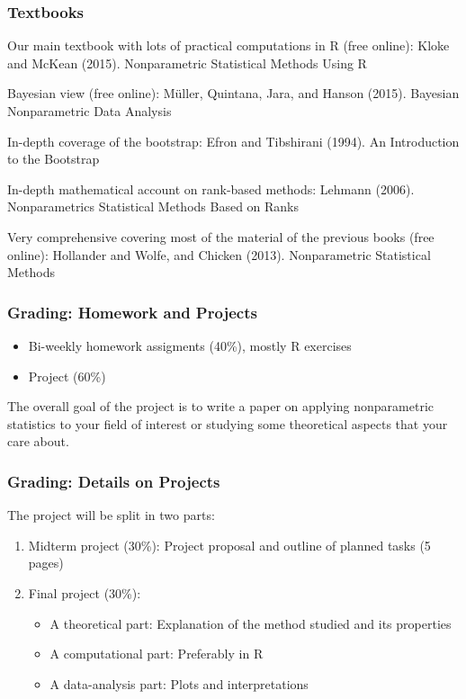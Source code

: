 \documentclass[10pt]{beamer}
\begin{document}
\begin{frame}
\frametitle{Textbooks}

Our main textbook with lots of practical computations in R (free online): \newline
Kloke and McKean (2015). Nonparametric Statistical Methods Using R \newline

Bayesian view (free online): \newline
M\"uller, Quintana, Jara, and Hanson (2015). Bayesian Nonparametric Data Analysis \newline

In-depth coverage of the bootstrap: \newline
Efron and Tibshirani (1994). An Introduction to the Bootstrap  \newline

In-depth mathematical account on rank-based methods: \newline
Lehmann (2006). Nonparametrics Statistical Methods Based on Ranks \newline

Very comprehensive covering most of the material of the previous books (free online): \newline
Hollander and Wolfe, and Chicken (2013). Nonparametric Statistical Methods \newline

\end{frame}

\begin{frame}
\frametitle{Grading: Homework and Projects}

\begin{itemize}
\item Bi-weekly homework assigments (40\%), mostly R exercises
\item Project (60\%)
\end{itemize}

The overall goal of the project is to write a paper on applying nonparametric statistics to your field of interest or studying some theoretical aspects that your care about.

\end{frame}

\begin{frame}
\frametitle{Grading: Details on Projects}

The project will be split in two parts:
\begin{enumerate}
\item Midterm project (30\%): Project proposal and outline of planned tasks (5 pages)
\item Final project (30\%): 
\begin{itemize}
\item A theoretical part: Explanation of the method studied and its properties
\item A computational part: Preferably in R
\item A data-analysis part: Plots and interpretations
\end{itemize}
\end{enumerate}

\end{frame}
\end{document}
